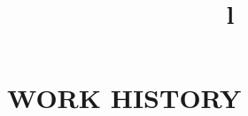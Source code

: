 \section{WORK HISTORY}

\begin{format}
\begin{samepage}
	\title{l}    \\
	 \\
	\body\\
\end{samepage}
\end{format}








